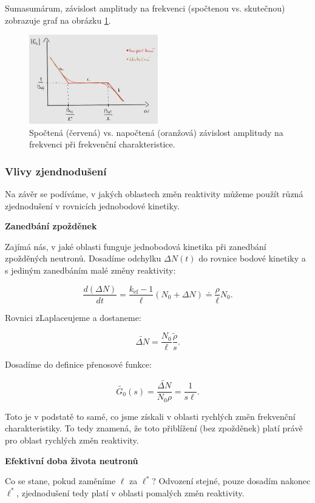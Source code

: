 Sumasumárum, závislost amplitudy na frekvenci (spočtenou vs. skutečnou) zobrazuje graf na obrázku \ref{fig_amplituda_frekvence}.

\begin{figure}[H]
  \centering
  \includegraphics[width=0.5\textwidth]{img/amplituda_frekvence.jpg}
  \caption{Spočtená (červená) vs. napočtená (oranžová) závislost amplitudy na frekvenci při frekvenční charakteristice.}
  \label{fig_amplituda_frekvence}
\end{figure}

\subsubsection{Vlivy zjendnodušení}

Na závěr se podíváme, v jakých oblastech změn reaktivity můžeme použít různá zjednodušení v rovnicích jednobodové kinetiky.

\textbf{Zanedbání zpožděnek}

Zajímá nás, v jaké oblasti funguje jednobodová kinetika při zanedbání zpožděných neutronů. Dosadíme odchylku $\Delta N(t)$ do rovnice bodové kinetiky a s jediným zanedbáním malé změny reaktivity:

$$ \dfrac{d (\Delta N)}{dt} = \dfrac{k_{\text{ef}}-1}{\ell} (N_0 + \Delta N) \doteq \dfrac{\rho}{\ell} N_0. $$

Rovnici zLaplaceujeme a dostaneme:

$$ \tilde{\Delta N} = \dfrac{N_0}{\ell} \dfrac{\tilde{\rho}}{s}. $$

Dosadíme do definice přenosové funkce:

$$ \tilde{G_0}(s) = \dfrac{\tilde{\Delta N}}{N_0 \rho} = \dfrac{1}{s \ell}. $$

Toto je v podstatě to samé, co jsme získali v oblasti rychlých změn frekvenční charakteristiky. To tedy znamená, že toto přiblížení (bez zpožděnek) platí právě pro oblast rychlých změn reaktivity.

\textbf{Efektivní doba života neutronů}

Co se stane, pokud zaměníme $\ell$ za $\ell^*$? Odvození stejné, pouze dosadím nakonec $\ell^*$, zjednodušení tedy platí v oblasti pomalých změn reaktivity.

